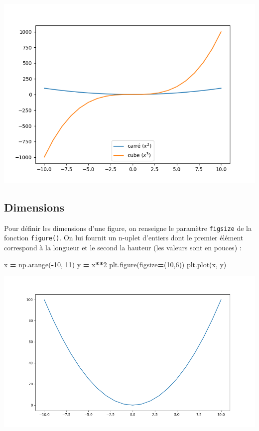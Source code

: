 \documentclass[
  12pt,
]{book}
\newenvironment{Shaded}{\begin{snugshade}}{\end{snugshade}}
\newcommand{\DecValTok}[1]{\textcolor[rgb]{0.00,0.00,0.81}{#1}}
\newcommand{\NormalTok}[1]{#1}
\newcommand{\OperatorTok}[1]{\textcolor[rgb]{0.81,0.36,0.00}{\textbf{#1}}}
\numberwithin{equation}{section}
\numberwithin{countremarque}{section}
\begin{document}
\begin{center}\includegraphics[width=9.03in]{figs/pyplot/plot_legende_pos} \end{center}

\subsection{Dimensions}\label{dimensions-2}

Pour définir les dimensions d'une figure, on renseigne le paramètre \texttt{figsize} de la fonction \texttt{figure()}. On lui fournit un n-uplet d'entiers dont le premier élément correspond à la longueur et le second la hauteur (les valeurs sont en pouces) :

\begin{Shaded}
\begin{Highlighting}[]
\NormalTok{x }\OperatorTok{=}\NormalTok{ np.arange(}\OperatorTok{{-}}\DecValTok{10}\NormalTok{, }\DecValTok{11}\NormalTok{)}
\NormalTok{y }\OperatorTok{=}\NormalTok{ x}\OperatorTok{**}\DecValTok{2}
\NormalTok{plt.figure(figsize}\OperatorTok{=}\NormalTok{(}\DecValTok{10}\NormalTok{,}\DecValTok{6}\NormalTok{))}
\NormalTok{plt.plot(x, y)}
\end{Highlighting}
\end{Shaded}

\begin{center}\includegraphics[width=13.89in]{figs/pyplot/plot_size} \end{center}
\end{document}

